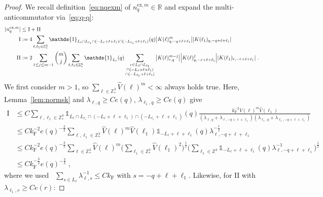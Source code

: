 \documentclass[12pt,a4paper]{article}
\numberwithin{equation}{section}
\newcommand{\RRR}{\mathbb{R}}
\newcommand{\1}{\mathbb{I}}
\newcommand{\ex}{\mathrm{ex}}
\newcommand{\F}{\mathrm{F}}
\newcommand{\I}{\mathrm{I}}
\newcommand{\II}{\mathrm{II}}
\newcommand{\Z}{\mathbb{Z}}
\newcommand{\half}{\frac{1}{2}}
\theoremstyle{plain}
\theoremstyle{definition}
\theoremstyle{remark}
\theoremstyle{plain}
\theoremstyle{definition}
\theoremstyle{remark}
\begin{document}
\begin{proof}
We recall definition~\eqref{eq:nqexm} of $ n_q^{\ex,m} \in \RRR $ and expand the multi-anticommutator via~\eqref{eq:q-q}:
\begin{equation}
\begin{aligned}
	|n_q^{\ex,m}|
	&\leq \I + \II \\
	\I
	&:= 4 \sum_{\ell,\ell_1 \in \Z^3_*}
		\mathds{1}_{L_\ell \cap L_{\ell_1} \cap (-L_\ell + \ell + \ell_1) \cap (-L_{\ell_1} + \ell + \ell_1)}(q)
		\abs{K(\ell)^m_{q,-q+\ell+\ell_1}}
		\abs{K(\ell_1)_{q,-q+\ell+\ell_1}} \\
	\II
	&:= 2 \sum_{1 \le j \le m-1} {{m}\choose j} \sum_{\ell,\ell_1 \in \Z^3_*}
		\mathds{1}_{L_\ell}(q)
		\sum_{\substack{r\in L_{\ell} \cap L_{\ell_1}\\ \cap (-L_{\ell}+\ell+\ell_1) \\ \cap (-L_{\ell_1}+\ell+\ell_1 )}}
		\abs{K(\ell)^{m-j}_{r,q}}
		\abs{K(\ell)^j_{q,-r+\ell+\ell_1}}
		\abs{K(\ell_1)_{r,-r+\ell+\ell_1}} \;.
\end{aligned}
\end{equation}
We first consider $ m > 1 $, so $ \sum_{\ell \in \Z^3_*} \hat{V}(\ell)^m < \infty $ always holds true. Here, Lemma~\ref{lem:normsk} and $  \lambda_{\ell,q} \geq C e(q) $, $ \lambda_{\ell_1,q} \geq C e(q) $ give
\begin{align}
	\I
	&\leq C \sum_{\ell,\ell_1 \in \Z^3_*}
		\mathds{1}_{L_\ell \cap L_{\ell_1} \cap (-L_\ell + \ell + \ell_1) \cap (-L_{\ell_1} + \ell + \ell_1)}(q)
		\frac{k_{\F}^{-2} \hat{V}(\ell)^m \hat{V}(\ell_1)}{(\lambda_{\ell,q} + \lambda_{\ell,-q+\ell+\ell_1}) (\lambda_{\ell_1,q} + \lambda_{\ell_1,-q+\ell+\ell_1})} \nonumber\\
	&\leq C k_{\F}^{-2} e(q)^{-\frac 32} \sum_{\ell,\ell_1 \in \Z^3_*} \hat{V}(\ell)^m \hat{V}(\ell_1)
		\mathds{1}_{-L_\ell + \ell + \ell_1}(q)
		\lambda_{\ell,-q+\ell+\ell_1}^{-\frac 12} \nonumber\\ 
	&\leq C k_{\F}^{-2} e(q)^{-\frac 32} \sum_{\ell \in \Z^3_*} \hat{V}(\ell)^m
		\Bigg( \sum_{\ell_1 \in \Z^3_*} \hat{V}(\ell_1)^2 \Bigg)^{\half}
		\Bigg( \sum_{\ell_1 \in \Z^3} \mathds{1}_{-L_\ell + \ell + \ell_1}(q)
		\lambda_{\ell,-q+\ell+\ell_1}^{-1} \Bigg)^{\half} \nonumber\\
	&\leq C k_{\F}^{-\frac 32} e(q)^{-\frac 32} \;,
\end{align}
where we used~\cite[Prop.~A.2]{CHN21} $ \sum_{s \in L_\ell} \lambda_{\ell,s}^{-1} \le C k_{\F} $ with $ s = -q+\ell+\ell_1 $. Likewise, for $ \II $ with $ \lambda_{\ell_1,r} \ge C e(r) $:

\end{proof}
\end{document}
